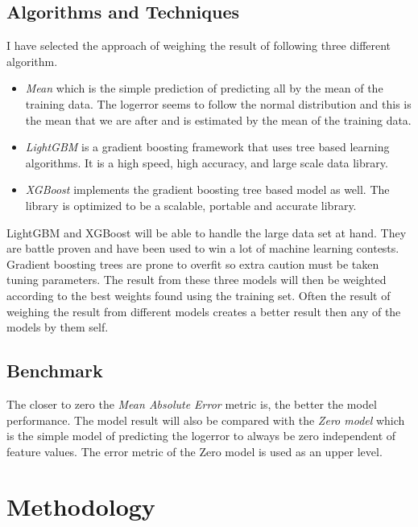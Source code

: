 \documentclass[a4paper]{article}
\begin{document}
\subsection{Algorithms and Techniques}
I have selected the approach of weighing the result of following three different algorithm.
\begin{itemize}
    \item
        \textit{Mean} which is the simple prediction of predicting all by the mean of the training data.
        The logerror seems to follow the normal distribution and this is the mean that we are after and is estimated
        by the mean of the training data.
    \item
        \textit{LightGBM} is a gradient boosting framework that uses tree based learning algorithms. It is a
        high speed, high accuracy, and large scale data library.
    \item
        \textit{XGBoost} implements the gradient boosting tree based model as well. The library is optimized to
        be a scalable, portable and accurate library.
\end{itemize}
LightGBM and XGBoost will be able to handle the large data set at hand. They are battle proven and have been used to
win a lot of machine learning contests. Gradient boosting trees are prone to overfit so extra caution must be
taken tuning parameters. The result from these three models will then be weighted according to the best weights
found using the training set. Often the result of weighing the result from different models creates a better result
then any of the models by them self.

\subsection{Benchmark}
The closer to zero the \textit{Mean Absolute Error} metric is, the better the model performance. The model result
will also be compared with the \textit{Zero model} which is the simple model of predicting the logerror
to always be zero independent of feature values. The error metric of the Zero model is used as an upper level.


\section{Methodology}
\end{document}
